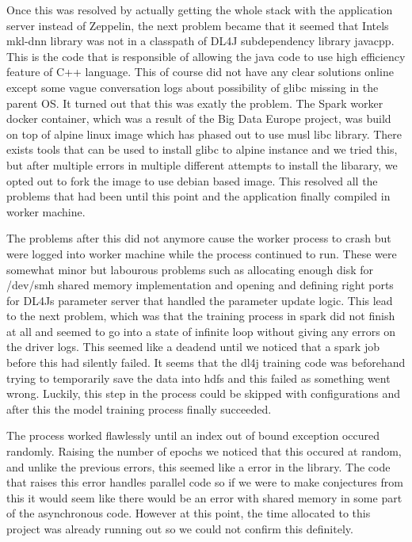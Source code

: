 Once this was resolved by actually getting the whole stack with the application server instead of Zeppelin, the next problem became that it seemed that Intels mkl-dnn library was not in a classpath of DL4J subdependency library javacpp.
This is the code that is responsible of allowing the java code to use high efficiency feature of C++ language.
This of course did not have any clear solutions online except some vague conversation logs about possibility of glibc missing in the parent OS.
It turned out that this was exatly the problem.
The Spark worker docker container, which was a result of the Big Data Europe project, was build on top of alpine linux image which has phased out to use musl libc library.
There exists tools that can be used to install glibc to alpine instance and we tried this, but after multiple errors in multiple different attempts to install the libarary, we opted out to fork the image to use debian based image.
This resolved all the problems that had been until this point and the application finally compiled in worker machine.

The problems after this did not anymore cause the worker process to crash but were logged into worker machine while the process continued to run. 
These were somewhat minor but labourous problems such as allocating enough disk for /dev/smh shared memory implementation and opening and defining right ports for DL4Js parameter server that handled the parameter update logic.
This lead to the next problem, which was that the training process in spark did not finish at all and seemed to go into a state of infinite loop without giving any errors on the driver logs.
This seemed like a deadend until we noticed that a spark job before this had silently failed.
It seems that the dl4j training code was beforehand trying to temporarily save the data into hdfs and this failed as something went wrong.
Luckily, this step in the process could be skipped with configurations and after this the model training process finally succeeded.

The process worked flawlessly until an index out of bound exception occured randomly.
Raising the number of epochs we noticed that this occured at random, and unlike the previous errors, this seemed like a error in the library.
The code that raises this error handles parallel code so if we were to make conjectures from this it would seem like there would be an error with shared memory in some part of the asynchronous code.
However at this point, the time allocated to this project was already running out so we could not confirm this definitely.

